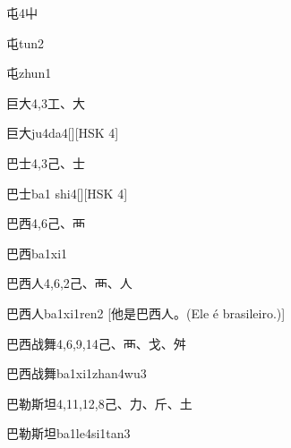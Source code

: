 \begin{entry}{屯}{4}{⼬}
  \begin{phonetics}{屯}{tun2}
  \end{phonetics}
  \begin{phonetics}{屯}{zhun1}
  \end{phonetics}
\end{entry}

\begin{entry}{巨大}{4,3}{⼯、⼤}
  \begin{phonetics}{巨大}{ju4da4}[][HSK 4]
  \end{phonetics}
\end{entry}

\begin{entry}{巴士}{4,3}{⼰、⼠}
  \begin{phonetics}{巴士}{ba1 shi4}[][HSK 4]
  \end{phonetics}
\end{entry}

\begin{entry}{巴西}{4,6}{⼰、⾑}
  \begin{phonetics}{巴西}{ba1xi1}
  \end{phonetics}
\end{entry}

\begin{entry}{巴西人}{4,6,2}{⼰、⾑、⼈}
  \begin{phonetics}{巴西人}{ba1xi1ren2}
    [他是巴西人。(Ele é brasileiro.)]
  \end{phonetics}
\end{entry}

\begin{entry}{巴西战舞}{4,6,9,14}{⼰、⾑、⼽、⾇}
  \begin{phonetics}{巴西战舞}{ba1xi1zhan4wu3}
  \end{phonetics}
\end{entry}

\begin{entry}{巴勒斯坦}{4,11,12,8}{⼰、⼒、⽄、⼟}
  \begin{phonetics}{巴勒斯坦}{ba1le4si1tan3}
  \end{phonetics}
\end{entry}

